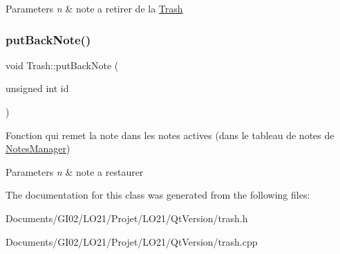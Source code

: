 \begin{DoxyParams}{Parameters}
{\em n} & note a retirer de la \hyperlink{class_trash}{Trash} \\
\hline
\end{DoxyParams}
\mbox{\label{class_trash_aab5b97637ce7706c0818261bfbdcbd05}} 
\subsubsection{\texorpdfstring{put\+Back\+Note()}{putBackNote()}}
{\footnotesize\ttfamily void Trash\+::put\+Back\+Note (\begin{DoxyParamCaption}\item[{unsigned int}]{id }\end{DoxyParamCaption})}



Fonction qui remet la note dans les notes actives (dans le tableau de notes de \hyperlink{class_notes_manager}{Notes\+Manager}) 


\begin{DoxyParams}{Parameters}
{\em n} & note a restaurer \\
\hline
\end{DoxyParams}


The documentation for this class was generated from the following files\+:\begin{DoxyCompactItemize}
\item 
Documents/\+G\+I02/\+L\+O21/\+Projet/\+L\+O21/\+Qt\+Version/trash.\+h\item 
Documents/\+G\+I02/\+L\+O21/\+Projet/\+L\+O21/\+Qt\+Version/trash.\+cpp\end{DoxyCompactItemize}
